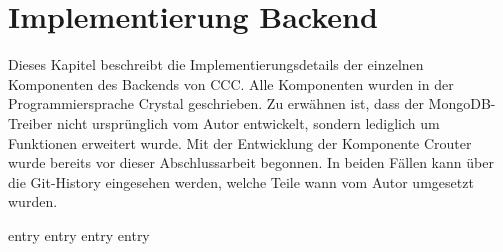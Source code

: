 \chapter{Implementierung Backend}
\label{chap:implementierung_backend}

Dieses Kapitel beschreibt die Implementierungsdetails der einzelnen Komponenten
des Backends von CCC.  Alle Komponenten wurden in der Programmiersprache
Crystal geschrieben.  Zu erwähnen ist, dass der MongoDB-Treiber nicht
ursprünglich vom Autor entwickelt, sondern lediglich um Funktionen erweitert
wurde.  Mit der Entwicklung der Komponente Crouter wurde bereits vor dieser
Abschlussarbeit begonnen.  In beiden Fällen kann über die Git-History eingesehen
werden, welche Teile wann vom Autor umgesetzt wurden.

{entry}
{entry}
{entry}
{entry}
